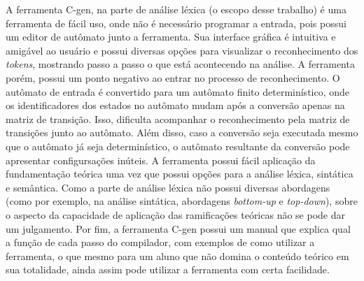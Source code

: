 A ferramenta C-gen, na parte de análise léxica (o escopo desse trabalho) é uma ferramenta de fácil uso, onde não é necessário programar a entrada, pois possui um editor de autômato junto a ferramenta. Sua interface gráfica é intuitiva e amigável ao usuário e possui diversas opções para visualizar o reconhecimento dos \textit{tokens}, mostrando passo a passo o que está acontecendo na análise. A ferramenta porém, possui um ponto negativo ao entrar no processo de reconhecimento. O autômato de entrada é convertido para um autômato finito determinístico, onde os identificadores dos estados no autômato mudam após a conversão apenas na matriz de transição. Isso, dificulta acompanhar o reconhecimento pela matriz de transições junto ao autômato. Além disso, caso a conversão seja executada mesmo que o autômato já seja determinístico, o autômato resultante da conversão pode apresentar configursações inúteis. A ferramenta possui fácil aplicação da fundamentação teórica uma vez que possui opções para a análise léxica, sintática e semântica. Como a parte de análise léxica não possui diversas abordagens (como por exemplo, na análise sintática, abordagens \textit{bottom-up} e \textit{top-down}), sobre o aspecto da capacidade de aplicação das ramificações teóricas não se pode dar um julgamento. Por fim, a ferramenta C-gen possui um manual que explica qual a função de cada passo do compilador, com exemplos de como utilizar a ferramenta, o que mesmo para um aluno que não domina o conteúdo teórico em sua totalidade, ainda assim pode utilizar a ferramenta com certa facilidade.




